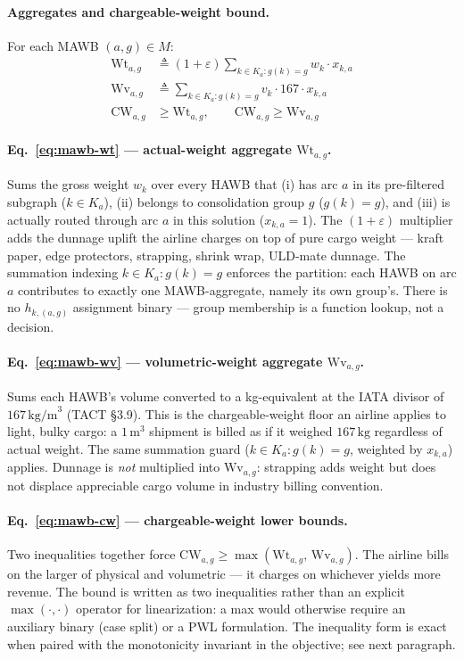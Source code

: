 \documentclass[11pt,a4paper]{article}
\newcommand{\defeq}{\triangleq}
\theoremstyle{definition}
\begin{document}
\paragraph{Aggregates and chargeable-weight bound.}
For each MAWB $(a, g) \in M$:
\begin{align}
  \text{Wt}_{a,g} &\defeq (1 + \varepsilon) \sum_{k \in K_a : g(k) = g} w_k \cdot x_{k,a}
    \label{eq:mawb-wt} \\
  \text{Wv}_{a,g} &\defeq \sum_{k \in K_a : g(k) = g} v_k \cdot 167 \cdot x_{k,a}
    \label{eq:mawb-wv} \\
  \text{CW}_{a,g} &\geq \text{Wt}_{a,g}, \qquad
  \text{CW}_{a,g} \geq \text{Wv}_{a,g}
    \label{eq:mawb-cw}
\end{align}

\paragraph{Eq.~\ref{eq:mawb-wt} --- actual-weight aggregate $\text{Wt}_{a,g}$.}
Sums the gross weight $w_k$ over every HAWB that (i) has arc $a$ in its
pre-filtered subgraph ($k \in K_a$), (ii) belongs to consolidation group $g$
($g(k) = g$), and (iii) is actually routed through arc $a$ in this solution
($x_{k,a} = 1$). The $(1 + \varepsilon)$ multiplier adds the dunnage uplift
the airline charges on top of pure cargo weight --- kraft paper, edge
protectors, strapping, shrink wrap, ULD-mate dunnage. The summation indexing
$k \in K_a : g(k) = g$ enforces the partition: each HAWB on arc $a$
contributes to exactly one MAWB-aggregate, namely its own group's. There is
no $h_{k,(a,g)}$ assignment binary --- group membership is a function lookup,
not a decision.

\paragraph{Eq.~\ref{eq:mawb-wv} --- volumetric-weight aggregate $\text{Wv}_{a,g}$.}
Sums each HAWB's volume converted to a kg-equivalent at the IATA divisor of
$167\,\text{kg/m}^3$ (TACT \S3.9). This is the chargeable-weight floor an
airline applies to light, bulky cargo: a $1\,\text{m}^3$ shipment is billed
as if it weighed $167\,\text{kg}$ regardless of actual weight. The same
summation guard ($k \in K_a : g(k) = g$, weighted by $x_{k,a}$) applies.
Dunnage is \emph{not} multiplied into $\text{Wv}_{a,g}$: strapping adds
weight but does not displace appreciable cargo volume in industry billing
convention.

\paragraph{Eq.~\ref{eq:mawb-cw} --- chargeable-weight lower bounds.}
Two inequalities together force $\text{CW}_{a,g} \geq \max(\text{Wt}_{a,g},\,
\text{Wv}_{a,g})$. The airline bills on the larger of physical and
volumetric --- it charges on whichever yields more revenue. The bound is
written as two inequalities rather than an explicit $\max(\cdot, \cdot)$
operator for linearization: a max would otherwise require an auxiliary
binary (case split) or a PWL formulation. The inequality form is exact when
paired with the monotonicity invariant in the objective; see next paragraph.
\end{document}
